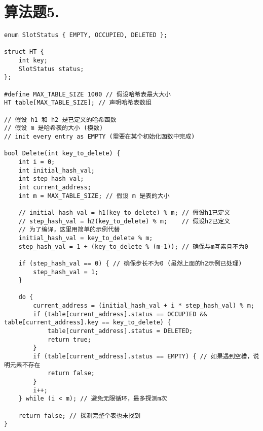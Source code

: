 \documentclass{ctexart}
\begin{document}
\section*{算法题5.}
\begin{lstlisting}
enum SlotStatus { EMPTY, OCCUPIED, DELETED };

struct HT {
    int key;
    SlotStatus status;
};

#define MAX_TABLE_SIZE 1000 // 假设哈希表最大大小
HT table[MAX_TABLE_SIZE]; // 声明哈希表数组

// 假设 h1 和 h2 是已定义的哈希函数
// 假设 m 是哈希表的大小 (模数)
// init every entry as EMPTY (需要在某个初始化函数中完成)

bool Delete(int key_to_delete) {
    int i = 0;
    int initial_hash_val;
    int step_hash_val;
    int current_address;
    int m = MAX_TABLE_SIZE; // 假设 m 是表的大小

    // initial_hash_val = h1(key_to_delete) % m; // 假设h1已定义
    // step_hash_val = h2(key_to_delete) % m;    // 假设h2已定义
    // 为了编译，这里用简单的示例代替
    initial_hash_val = key_to_delete % m; 
    step_hash_val = 1 + (key_to_delete % (m-1)); // 确保与m互素且不为0

    if (step_hash_val == 0) { // 确保步长不为0 (虽然上面的h2示例已处理)
        step_hash_val = 1;
    }

    do {
        current_address = (initial_hash_val + i * step_hash_val) % m;
        if (table[current_address].status == OCCUPIED && table[current_address].key == key_to_delete) {
            table[current_address].status = DELETED;
            return true;
        }
        if (table[current_address].status == EMPTY) { // 如果遇到空槽，说明元素不存在
            return false;
        }
        i++;
    } while (i < m); // 避免无限循环，最多探测m次

    return false; // 探测完整个表也未找到
}
\end{lstlisting}
\end{document}
